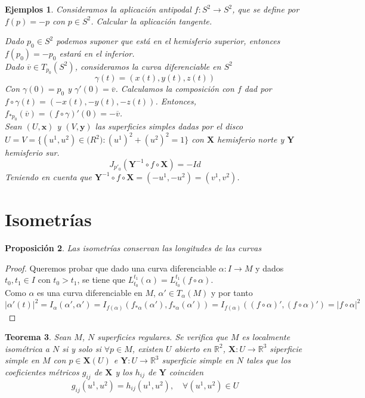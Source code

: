 \documentclass[a4paper,10pt]{book}
\newtheorem{thm}{Teorema}[chapter]
\newtheorem{prop}[thm]{Proposición}
\newtheorem{eje}[thm]{Ejemplos}
\newcommand{\ov}{\overline{v}}
\newcommand{\UX}{(U,\textbf{x})}
\newcommand{\VY}{(V,\textbf{y})}
\begin{document}
\begin{eje}
	Consideramos la aplicación antipodal $f:S^2\longrightarrow S^2$, que se define por $f(p)=-p$ con $p\in S^2$. Calcular la aplicación tangente.
	
	Dado $p_0\in S^2$ podemos suponer que está en el hemisferio superior, entonces $f(p_0)=-p_0$ estará en el inferior.\\
	Dado $\overline{v}\in T_{p_0}(S^2)$, consideramos la curva diferenciable en $S^2$ 
	\[
	\gamma(t)=(x(t),y(t),z(t))
	\]
	Con $\gamma(0)=p_0$ y $\gamma'(0)=\ov$. Calculamos la composición con $f$ dad por $f \circ \gamma (t)=(-x(t),-y(t),-z(t))$. Entonces, $f_{*p_0}(\ov)=(f\circ \gamma)'(0)=-\ov$.\\
	Sean $\UX$ y $\VY$ las superficies simples dadas por el disco $U=V=\{(u^1,u^2)\in\mathbb(R^2):(u^1)^2+(u^2)^2=1\}$ con $\mathbf{X}$ hemisferio norte y $\mathbf{Y}$ hemisferio sur.
	\[
	J_{p'_0}(\mathbf{Y}^{-1}\circ f\circ \mathbf{X})=-Id
	\]
	Teniendo en cuenta que $\mathbf{Y}^{-1}\circ f\circ \mathbf{X}=(-u^1,-u^2)=(v^1,v^2)$.
\end{eje}

\section{Isometrías}
\begin{prop}
Las isometrías conservan las longitudes de las curvas
\end{prop}

\begin{proof}
Queremos probar que dado una curva diferenciable $\alpha:I\longrightarrow M$ y dados $t_0,t_1\in I$ con $t_0>t_1$, se tiene que $L^{t_1}_{t_0}(\alpha)=L^{t_1}_{t_0}(f\circ\alpha) $.\\
Como $\alpha$ es una curva diferenciable en $M$, $\alpha'\in T_{\alpha}(M)$ y por tanto $|\alpha'(t)|^2=I_\alpha(\alpha',\alpha')=I_{f(\alpha)}(f_{*\alpha}(\alpha'),f_{*\alpha}(\alpha'))=I_{f(\alpha)}((f\circ \alpha)',(f\circ \alpha)')=|f\circ \alpha|^2$
\end{proof}

\begin{thm}
Sean $M$, $N$ superficies regulares. Se verifica que $M$ es localmente isométrica a $N$ si y solo si $\forall p\in M$, existen $U$ abierto en $\mathbb{R}^2$, $\mathbf{X}:U\longrightarrow \mathbb{R}^3$ siperficie simple en $M$ con $p\in \mathbf{X}(U)$ e $\mathbf{Y}:U\longrightarrow \mathbb{R}^3$ superficie simple en $N$ tales que los coeficientes métricos $g_{ij}$ de $\mathbf{X}$ y los $h_{ij}$ de $\mathbf{Y}$ coinciden
\[
g_{ij}(u^1,u^2)=h_{ij}(u^1,u^2), \quad \forall (u^1,u^2)\in U
\]
\end{thm}
\end{document}
